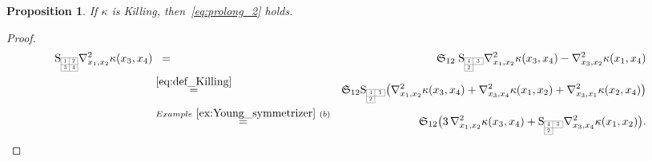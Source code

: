 \documentclass[11pt,a4paper]{article}
\theoremstyle{plain}
\newtheorem{proposition}{Proposition}
\theoremstyle{remark}
\newcommand{\cyclic}{\mathfrak{S}}
\newcommand{\rmS}{\mathrm{S}}
\begin{document}

\bigskip
\begin{proposition} \label{p:prolong_4}
If $\kappa$ is Killing, then~\eqref{eq:prolong_2} holds.%
\end{proposition}

\begin{proof}
\begin{eqnarray*}
\rmS_{\scaleto{\begin{array}{|c|c|}
\cline{1-2}
1 & 2 \\
\cline{1-2}
3 & 4 \\
\cline{1-2}
\end{array}}{12pt}}\nabla^2_{x_1,x_2}\kappa(x_3,x_4) &\;\;=\;\;& \cyclic_{12}\; \rmS_{\scaleto{\begin{array}{|c|c|}
\cline{1-2}
4 & 3 \\
\cline{1-2}
2 & \multicolumn{1}{c}{\;\;\;} \\
\cline{1-1}
\end{array}}{12pt}} \nabla^2_{x_1,x_2}\kappa(x_3,x_4) - \nabla^2_{x_3,x_2}\kappa(x_1,x_4)\\
& \stackrel{\eqref{eq:def_Killing}}{=} & \cyclic_{12} \rmS_{\scaleto{\begin{array}{|c|c|}
\cline{1-2}
4 & 3 \\
\cline{1-2}
2 & \multicolumn{1}{c}{\;\;\;} \\
\cline{1-1}
\end{array}}{12pt}}\big (\nabla^2_{x_1,x_2}\kappa(x_3,x_4) + \nabla^2_{x_3,x_4}\kappa(x_1,x_2) +  \nabla^2_{x_3,x_1}\kappa(x_2,x_4)\big )\\
 & \stackrel{Example~\ref{ex:Young_symmetrizer}~(b)}{=} &\cyclic_{12}\big ( 3\, \nabla^2_{x_1,x_2}\kappa(x_3,x_4) + \rmS_{\scaleto{\begin{array}{|c|c|}
\cline{1-2}
4 & 3 \\
\cline{1-2}
2 & \multicolumn{1}{c}{\;\;\;} \\
\cline{1-1}
\end{array}}{12pt}}\nabla^2_{x_3,x_4}\kappa(x_1,x_2)\big ). 

\end{eqnarray*}
\end{proof}
\end{document}
